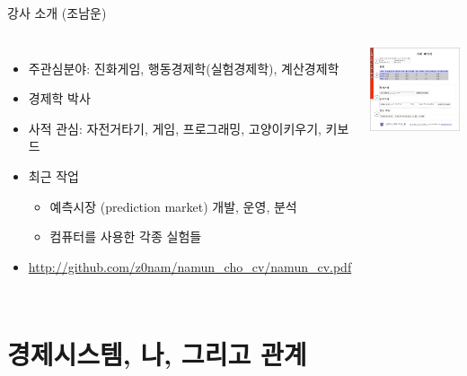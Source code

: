 \documentclass[final]{beamer}
\begin{document}
\begin{frame}[t]{강사 소개 (조남운)}
	\begin{columns}
		[c]
		\begin{itemize}
			\item 주관심분야: 진화게임, 행동경제학(실험경제학), 계산경제학 
			\item 경제학 박사
			\item 사적 관심: 자전거타기, 게임, 프로그래밍, 고양이키우기, 키보드
			\item 최근 작업
			\begin{itemize}
				\item 예측시장 (prediction market) 개발, 운영, 분석
				\item 컴퓨터를 사용한 각종 실험들 
			\end{itemize}
			\item \url{http://github.com/z0nam/namun_cho_cv/namun_cv.pdf}
		\end{itemize}
		\includegraphics[width=\textwidth]{spsm.png}
	\end{columns}
\end{frame}


\section{경제시스템, 나, 그리고 관계} %
\label{sec:econSystem}
\end{document}
